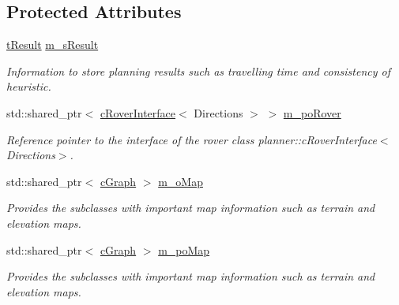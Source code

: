\subsection*{Protected Attributes}
\begin{DoxyCompactItemize}
\item 
\mbox{\label{classplanner_1_1c_planner_interface_a78389ea53bd3c9d5c57851a338ee91d8}} 
\mbox{\hyperlink{structt_result}{t\+Result}} \mbox{\hyperlink{classplanner_1_1c_planner_interface_a78389ea53bd3c9d5c57851a338ee91d8}{m\+\_\+s\+Result}}
\begin{DoxyCompactList}\small\item\em Information to store planning results such as travelling time and consistency of heuristic. \end{DoxyCompactList}\item 
\mbox{\label{classplanner_1_1c_planner_interface_a4ef4a42f9e26463899f7c54d06580d7f}} 
std\+::shared\+\_\+ptr$<$ \mbox{\hyperlink{classplanner_1_1c_rover_interface}{c\+Rover\+Interface}}$<$ Directions $>$ $>$ \mbox{\hyperlink{classplanner_1_1c_planner_interface_a4ef4a42f9e26463899f7c54d06580d7f}{m\+\_\+po\+Rover}}
\begin{DoxyCompactList}\small\item\em Reference pointer to the interface of the rover class planner\+::c\+Rover\+Interface$<$\+Directions$>$. \end{DoxyCompactList}\item 
\mbox{\label{classplanner_1_1c_planner_interface_a5145c31369e5092bfcfc836de75a5680}} 
std\+::shared\+\_\+ptr$<$ \mbox{\hyperlink{classplanner_1_1c_graph}{c\+Graph}} $>$ \mbox{\hyperlink{classplanner_1_1c_planner_interface_a5145c31369e5092bfcfc836de75a5680}{m\+\_\+o\+Map}}
\begin{DoxyCompactList}\small\item\em Provides the subclasses with important map information such as terrain and elevation maps. \end{DoxyCompactList}\item 
\mbox{\label{classplanner_1_1c_planner_interface_aa75ba58312d9398785d541a5e580a665}} 
std\+::shared\+\_\+ptr$<$ \mbox{\hyperlink{classplanner_1_1c_graph}{c\+Graph}} $>$ \mbox{\hyperlink{classplanner_1_1c_planner_interface_aa75ba58312d9398785d541a5e580a665}{m\+\_\+po\+Map}}
\begin{DoxyCompactList}\small\item\em Provides the subclasses with important map information such as terrain and elevation maps. \end{DoxyCompactList}\end{DoxyCompactItemize}


